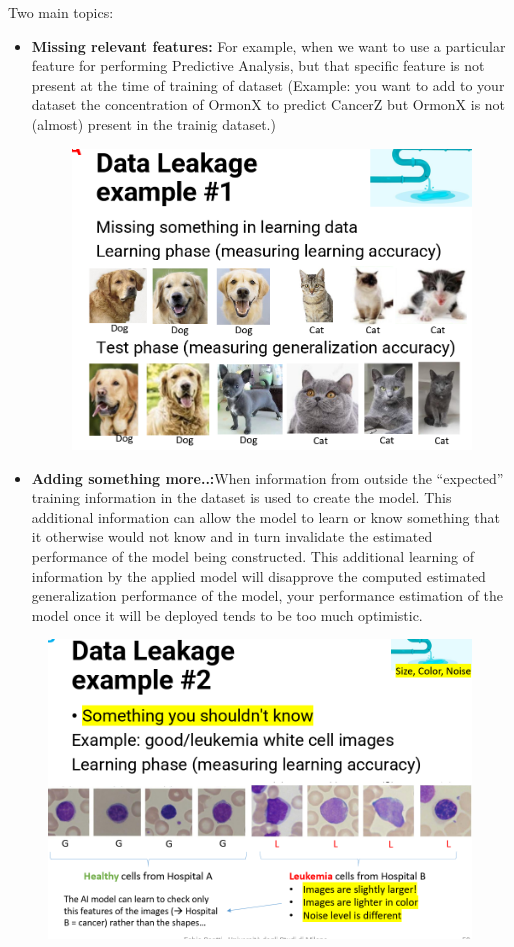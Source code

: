 \documentclass{report}
\begin{document}
\noindent Two main topics:
\begin{itemize}
    \item \textbf{Missing relevant features: }For example, when we want to use a particular feature for performing Predictive Analysis, but that specific feature is 
    not present at the time of training of dataset (Example: you want to add to your dataset the concentration of OrmonX to predict CancerZ but OrmonX is not (almost) present in the trainig dataset.)
    \begin{figure}[H]
        \centering
        \includegraphics[width=0.8\linewidth]{images/cani e gatti.png}
    \end{figure}
    \item \textbf{Adding something more..:}When information from outside the “expected” training information in the dataset is used to create the model. This additional information can allow the model to learn or know something that it otherwise would not know and in turn invalidate the estimated performance of the model being constructed.
    This additional learning of information by the applied model will disapprove the computed estimated generalization performance of the model, your performance estimation of the model once it will be deployed tends to be too much optimistic.
\end{itemize}
\begin{figure}[H]
    \centering
    \includegraphics[width=0.8\linewidth]{images/leucemia.png}
\end{figure}
\end{document}

